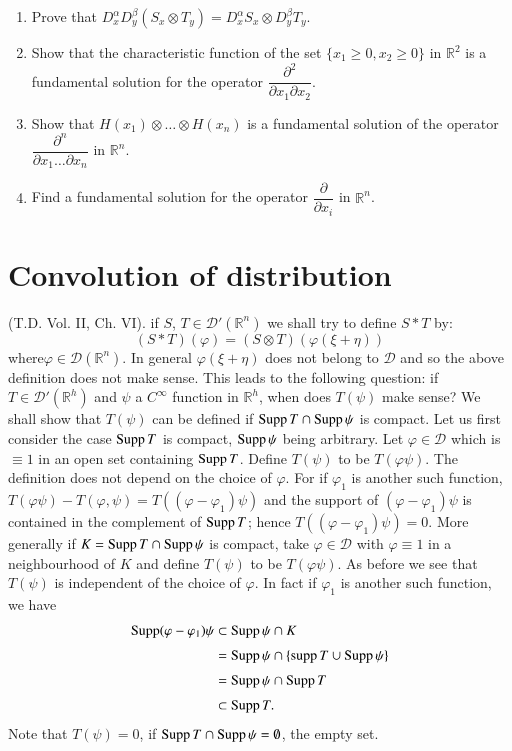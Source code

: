 \begin{exers*}
\begin{enumerate}
\renewcommand{\labelenumi}{(\theenumi)}
\item Prove that $D^{\alpha}_{x}D^{\beta}_{y}(S_{x}\otimes T_{y})=D^{\alpha}_{x}S_{x}\otimes D^{\beta}_{y}T_{y}$.

\item Show that the characteristic function of the set $\{x_{1}\geq 0, x_{2}\geq 0\}$ in $\mathbb{R}^{2}$ is a fundamental solution for the operator $\dfrac{\partial^{2}}{\partial x_{1}\partial x_{2}}$.

\item Show that $H(x_{1})\otimes \ldots \otimes H(x_{n})$ is a fundamental solution of the operator $\dfrac{\partial^{n}}{\partial x_{1}\ldots \partial x_{n}}$ in $\mathbb{R}^{n}$.

\item Find a fundamental solution for the operator $\dfrac{\partial}{\partial x_{i}}$ in $\mathbb{R}^{n}$.
\end{enumerate}
\end{exers*}

\section*{Convolution of distribution}

(T.D. Vol. II, Ch. VI). if $S$, $T\in \mathcal{D}'(\mathbb{R}^{n})$ we shall try to define $S\ast T$ by:
$$
(S\ast T)(\varphi)=(S\otimes T)(\varphi(\xi+\eta))
$$
where\pageoriginale $\varphi \in \mathcal{D}(\mathbb{R}^{n})$. In
general $\varphi(\xi+\eta)$ does not belong to $\mathcal{D}$ and so
the above definition does not make sense. This leads to the following
question: if $T\in \mathcal{D}'(\mathbb{R}^{h})$ and $\psi$ a
$C^{\infty}$ function in $\mathbb{R}^{h}$, when does $T(\psi)$ make
sense? We shall show that $T(\psi)$ can be defined if $\operatorname{Supp} T\cap
\operatorname{Supp} \psi$ is compact. Let us first consider the case $\operatorname{Supp} T$ is
compact, $\operatorname{Supp} \psi$ being arbitrary. Let $\varphi \in \mathcal{D}$
which is $\equiv 1$ in an open set containing $\operatorname{Supp} T$. Define
$T(\psi)$ to be $T(\varphi\psi)$. The definition does not depend on
the choice of $\varphi$. For if $\varphi_{1}$ is another such
function,
$T(\varphi\psi)-T(\varphi,\psi)=T((\varphi-\varphi_{1})\psi)$ and the
support of $(\varphi-\varphi_{1})\psi$ is contained in the complement
of $\operatorname{Supp} T$; hence $T((\varphi-\varphi_{1})\psi)=0$. More generally
if $K=\operatorname{Supp} T\cap \operatorname{Supp} \psi$ is compact, take $\varphi\in
\mathcal{D}$ with $\varphi\equiv 1$ in a neighbourhood of $K$ and
define $T(\psi)$ to be $T(\varphi\psi)$. As before we see that
$T(\psi)$ is independent of the choice of $\varphi$. In fact if
$\varphi_{1}$ is another such function, we have
\begin{align*}
\operatorname{Supp} (\varphi-\varphi_{1})\psi &\subset \operatorname{Supp} \psi \cap K\\[3pt]
&= \operatorname{Supp} \psi \cap \{\operatorname{supp} T \cup \operatorname{Supp} \psi\}\\[3pt]
&= \operatorname{Supp} \psi \cap \operatorname{Supp} T\\[3pt]
&\subset \operatorname{Supp} T.
\end{align*}
Note that $T(\psi)=0$, if $\operatorname{Supp} T\cap \operatorname{Supp} \psi=\emptyset$, the
empty set.

